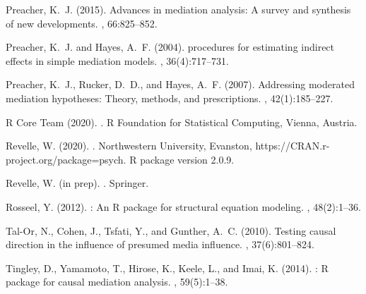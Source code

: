 \documentclass[11pt]{article}
\begin{document}
\begin{thebibliography}{}
Preacher, K.~J. (2015).
\newblock Advances in mediation analysis: A survey and synthesis of new
  developments.
, 66:825--852.

Preacher, K.~J. and Hayes, A.~F. (2004).
 procedures for estimating indirect effects in simple
  mediation models.
,
  36(4):717--731.

Preacher, K.~J., Rucker, D.~D., and Hayes, A.~F. (2007).
\newblock Addressing moderated mediation hypotheses: Theory, methods, and
  prescriptions.
, 42(1):185--227.

{R Core Team} (2020).
.
\newblock R Foundation for Statistical Computing, Vienna, Austria.

Revelle, W. (2020).
.
\newblock Northwestern University, Evanston,
  https://CRAN.r-project.org/package=psych.
\newblock R package version 2.0.9.

Revelle, W. ({in prep}).
.
\newblock Springer.

Rosseel, Y. (2012).
: An {R} package for structural equation modeling.
, 48(2):1--36.

Tal-Or, N., Cohen, J., Tsfati, Y., and Gunther, A.~C. (2010).
\newblock Testing causal direction in the influence of presumed media
  influence.
, 37(6):801--824.

Tingley, D., Yamamoto, T., Hirose, K., Keele, L., and Imai, K. (2014).
: {R} package for causal mediation analysis.
, 59(5):1--38.

\end{thebibliography}
\end{document}
